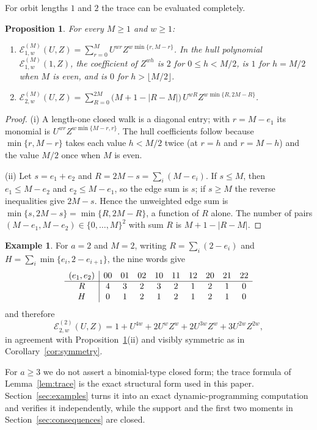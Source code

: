 \documentclass[11pt,a4paper]{article}
\newcommand{\Epoly}{\mathscr E}
\numberwithin{equation}{section}
\theoremstyle{plain}
\newtheorem{proposition}[theorem]{Proposition}
\theoremstyle{definition}
\newtheorem{example}[theorem]{Example}
\theoremstyle{remark}
\begin{document}
For orbit lengths $1$ and $2$ the trace can be evaluated completely.

\begin{proposition}\label{prop:short-orbits}
For every $M\geq1$ and $w\geq1$:
\begin{enumerate}
\item[\textup{(i)}]
$\displaystyle
\Epoly_{1,w}^{(M)}(U,Z)
 =\sum_{r=0}^{M}U^{wr}Z^{w\min\{r,M-r\}}$.
In the hull polynomial $\Epoly_{1,w}^{(M)}(1,Z)$, the coefficient of $Z^{wh}$
is $2$ for $0\leq h<M/2$, is $1$ for $h=M/2$ when $M$ is even, and is $0$ for
$h>\lfloor M/2\rfloor$.
\item[\textup{(ii)}]
$\displaystyle
\Epoly_{2,w}^{(M)}(U,Z)
 =\sum_{R=0}^{2M}\bigl(M+1-|R-M|\bigr)\,
    U^{wR}Z^{w\min\{R,2M-R\}}$.
\end{enumerate}
\end{proposition}

\begin{proof}
(i) A length-one closed walk is a diagonal entry; with $r=M-e_1$ its monomial is
$U^{wr}Z^{w\min\{M-r,r\}}$.  The hull coefficients follow because
$\min\{r,M-r\}$ takes each value $h<M/2$ twice (at $r=h$ and $r=M-h$) and the
value $M/2$ once when $M$ is even.

(ii) Let $s=e_1+e_2$ and $R=2M-s=\sum_i(M-e_i)$.  If $s\leq M$, then
$e_1\leq M-e_2$ and $e_2\leq M-e_1$, so the edge sum is $s$; if $s\geq M$ the
reverse inequalities give $2M-s$.  Hence the unweighted edge sum is
$\min\{s,2M-s\}=\min\{R,2M-R\}$, a function of $R$ alone.  The number of pairs
$(M-e_1,M-e_2)\in\{0,\ldots,M\}^2$ with sum $R$ is $M+1-|R-M|$.
\end{proof}

\begin{example}\label{ex:a2M2}
For $a=2$ and $M=2$, writing $R=\sum_i(2-e_i)$ and
$H=\sum_i\min\{e_i,2-e_{i+1}\}$, the nine words give
\[
\setlength{\tabcolsep}{4pt}
\begin{array}{c|ccccccccc}
(e_1,e_2)&00&01&02&10&11&12&20&21&22\\ \hline
R&4&3&2&3&2&1&2&1&0\\
H&0&1&2&1&2&1&2&1&0
\end{array}
\]
and therefore
\[
\Epoly_{2,w}^{(2)}(U,Z)
 =1+U^{4w}+2U^wZ^w+2U^{3w}Z^w+3U^{2w}Z^{2w},
\]
in agreement with Proposition~\ref{prop:short-orbits}(ii) and visibly symmetric
as in Corollary~\ref{cor:symmetry}.
\end{example}

For $a\geq3$ we do not assert a binomial-type closed form; the trace formula
of Lemma~\ref{lem:trace} is the exact structural form used in this paper.
Section~\ref{sec:examples} turns it into an exact dynamic-programming
computation and verifies it independently, while the support and the first
two moments in Section~\ref{sec:consequences} are closed.
\end{document}
